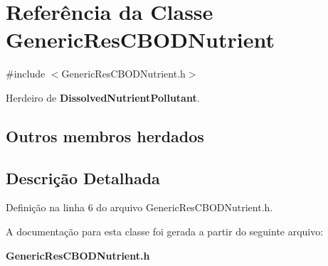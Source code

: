 \section{Referência da Classe Generic\+Res\+C\+B\+O\+D\+Nutrient}
\label{class_generic_res_c_b_o_d_nutrient}


{\ttfamily \#include $<$Generic\+Res\+C\+B\+O\+D\+Nutrient.\+h$>$}



Herdeiro de {\bf Dissolved\+Nutrient\+Pollutant}.

\subsection*{Outros membros herdados}


\subsection{Descrição Detalhada}


Definição na linha 6 do arquivo Generic\+Res\+C\+B\+O\+D\+Nutrient.\+h.



A documentação para esta classe foi gerada a partir do seguinte arquivo\+:\begin{DoxyCompactItemize}
\item 
{\bf Generic\+Res\+C\+B\+O\+D\+Nutrient.\+h}\end{DoxyCompactItemize}
